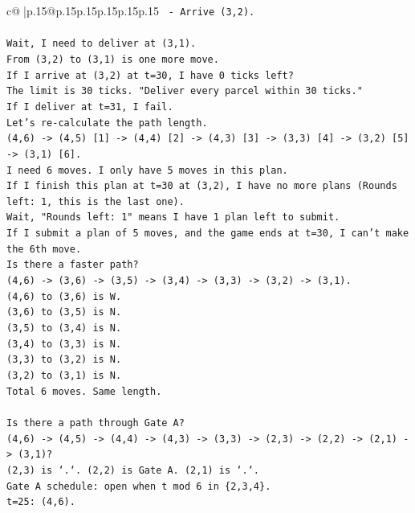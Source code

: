 \documentclass{article}
\begin{document}
{\begin{supertabular}{c@{$\;$}|p{.15\linewidth}@{}p{.15\linewidth}p{.15\linewidth}p{.15\linewidth}p{.15\linewidth}p{.15\linewidth}}
{{{\texttt{  {-} Arrive (3,2).} \\
\\ 
\texttt{Wait, I need to deliver at (3,1).} \\
\texttt{From (3,2) to (3,1) is one more move.} \\
\texttt{If I arrive at (3,2) at t=30, I have 0 ticks left?} \\
\texttt{The limit is 30 ticks. "Deliver every parcel within 30 ticks."} \\
\texttt{If I deliver at t=31, I fail.} \\
\texttt{Let's re{-}calculate the path length.} \\
\texttt{(4,6) {-}> (4,5) {[}1{]} {-}> (4,4) {[}2{]} {-}> (4,3) {[}3{]} {-}> (3,3) {[}4{]} {-}> (3,2) {[}5{]} {-}> (3,1) {[}6{]}.} \\
\texttt{I need 6 moves. I only have 5 moves in this plan.} \\
\texttt{If I finish this plan at t=30 at (3,2), I have no more plans (Rounds left: 1, this is the last one).} \\
\texttt{Wait, "Rounds left: 1" means I have 1 plan left to submit.} \\
\texttt{If I submit a plan of 5 moves, and the game ends at t=30, I can't make the 6th move.} \\
\texttt{Is there a faster path?} \\
\texttt{(4,6) {-}> (3,6) {-}> (3,5) {-}> (3,4) {-}> (3,3) {-}> (3,2) {-}> (3,1).} \\
\texttt{(4,6) to (3,6) is W.} \\
\texttt{(3,6) to (3,5) is N.} \\
\texttt{(3,5) to (3,4) is N.} \\
\texttt{(3,4) to (3,3) is N.} \\
\texttt{(3,3) to (3,2) is N.} \\
\texttt{(3,2) to (3,1) is N.} \\
\texttt{Total 6 moves. Same length.} \\
\\ 
\texttt{Is there a path through Gate A?} \\
\texttt{(4,6) {-}> (4,5) {-}> (4,4) {-}> (4,3) {-}> (3,3) {-}> (2,3) {-}> (2,2) {-}> (2,1) {-}> (3,1)?} \\
\texttt{(2,3) is `.`. (2,2) is Gate A. (2,1) is `.`.} \\
\texttt{Gate A schedule: open when t mod 6 in \{2,3,4\}.} \\
\texttt{t=25: (4,6).} \\
}}}
\end{supertabular}}
\end{document}
